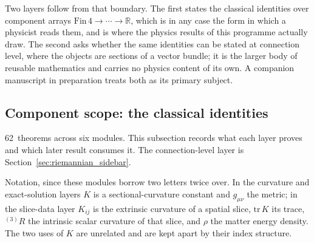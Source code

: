 \documentclass[11pt]{article}
\providecommand{\phaseSixfWonesixTotal}{62}
\begin{document}
Two layers follow from that boundary. The first states the classical
identities over component arrays
$\mathrm{Fin}\,4 \to \cdots \to \mathbb{R}$, which is in any case the
form in which a physicist reads them, and is where the physics results
of this programme actually draw. The second asks whether the same
identities can be stated at connection level, where the objects are
sections of a vector bundle; it is the larger body of reusable
mathematics and carries no physics content of its own. A companion
manuscript in preparation treats both as its primary subject.

\subsection{Component scope: the classical identities}

\phaseSixfWonesixTotal{}~theorems across six modules. This subsection
records what each layer proves and which later result consumes it. The
connection-level layer is
Section~\ref{sec:riemannian_sidebar}.

Notation, since these modules borrow two letters twice over. In the
curvature and exact-solution layers $K$ is a sectional-curvature
constant and $g_{\mu\nu}$ the metric; in the slice-data layer
$K_{ij}$ is the extrinsic curvature of a spatial slice, $\mathrm{tr}\,K$
its trace, ${}^{(3)}\!R$ the intrinsic scalar curvature of that slice,
and $\rho$ the matter energy density. The two uses of $K$ are
unrelated and are kept apart by their index structure.
\end{document}
